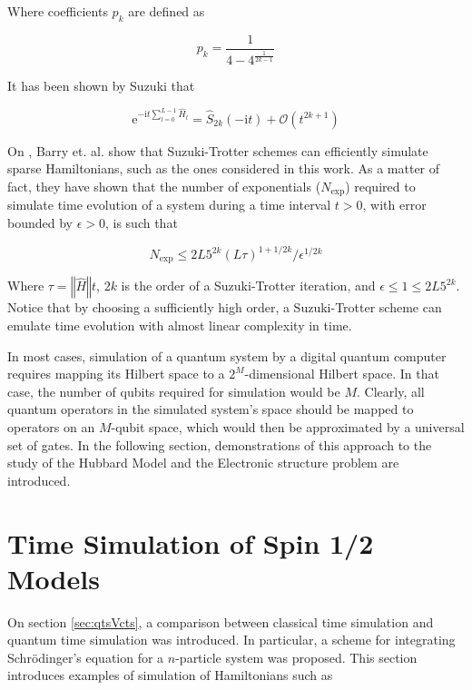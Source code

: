   Where coefficients $p_k$ are defined as

  \begin{equation}
    p_k = \frac{1}{4 - 4^{\frac{1}{2k-1}}}
    \label{eq:pk}
  \end{equation}

  It has been shown by Suzuki that \cite{SuzukiFormula}

  \begin{equation}
    \mathrm{e}^{-\mathrm{i}t \sum_{l = 0}^{L-1} \hat{H}_l} = \hat{S}_{2k}(-\mathrm{i}t) + \mathcal{O}(t^{2k+1})
  \end{equation}

  On \cite{BerryErrorBounds}, Barry et. al. show that Suzuki-Trotter schemes can efficiently simulate sparse Hamiltonians, such as the ones considered in this work. As a matter of fact, they have shown that the number of exponentials ($N_{\text{exp}}$) required to simulate time evolution of a system during a time interval $t > 0$, with error bounded by $\epsilon > 0$, is such that

  \begin{equation}
    N_{\text{exp}} \leq 2L5^{2k}(L\tau)^{1+1/2k}/\epsilon^{1/2k}
  \end{equation}

  Where $\tau = \left\Vert \hat{H} \right\Vert t$, $2k$ is the order of a Suzuki-Trotter iteration, and $\epsilon \leq 1 \leq 2L5^{2k}$. Notice that by choosing a sufficiently high order, a Suzuki-Trotter scheme can emulate time evolution with almost linear complexity in time.

  In most cases, simulation of a quantum system by a digital quantum computer requires mapping its Hilbert space to a $2^M$-dimensional Hilbert space. In that case, the number of qubits required for simulation would be $M$. Clearly, all quantum operators in the simulated system's space should be mapped to operators on an $M$-qubit space, which would then be approximated by a universal set of gates. In the following section, demonstrations of this approach to the study of the Hubbard Model and the Electronic structure problem are introduced.

\section{Time Simulation of Spin 1/2 Models}
\label{sec:hubbard}
  
  On section \ref{sec:qtsVcts}, a comparison between classical time simulation and quantum time simulation was introduced. In particular, a scheme for integrating Schrödinger's equation for a $n$-particle system was proposed. This section introduces examples of simulation of Hamiltonians such as

